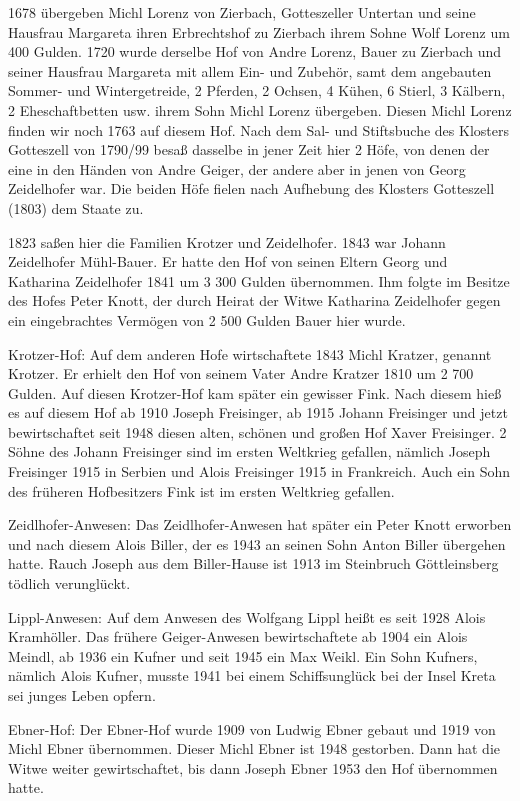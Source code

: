 \documentclass{book}
\begin{document}
1678 übergeben Michl Lorenz von Zierbach, Gotteszeller Untertan und seine
Hausfrau Margareta ihren Erbrechtshof zu Zierbach ihrem Sohne Wolf Lorenz um 400
Gulden. 1720 wurde derselbe Hof von Andre Lorenz, Bauer zu Zierbach und seiner
Hausfrau Margareta mit allem Ein- und Zubehör, samt dem angebauten Sommer- und
Wintergetreide, 2 Pferden, 2 Ochsen, 4 Kühen, 6 Stierl, 3 Kälbern, 2
Eheschaftbetten usw. ihrem Sohn Michl Lorenz übergeben. Diesen Michl Lorenz
finden wir noch 1763 auf diesem Hof. Nach dem Sal- und Stiftsbuche des Klosters
Gotteszell von 1790/99 besaß dasselbe in jener Zeit hier 2 Höfe, von denen der
eine in den Händen von Andre Geiger, der andere aber in jenen von Georg
Zeidelhofer war. Die beiden Höfe fielen nach Aufhebung des Klosters Gotteszell
(1803) dem Staate zu.

1823 saßen hier die Familien Krotzer und Zeidelhofer. 1843 war Johann
Zeidelhofer Mühl-Bauer. Er hatte den Hof von seinen Eltern Georg und Katharina
Zeidelhofer 1841 um 3 300 Gulden übernommen. Ihm folgte im Besitze des Hofes
Peter Knott, der durch Heirat der Witwe Katharina Zeidelhofer gegen ein
eingebrachtes Vermögen von 2 500 Gulden Bauer hier wurde.

Krotzer-Hof: Auf dem anderen Hofe wirtschaftete 1843 Michl Kratzer, genannt
Krotzer. Er erhielt den Hof von seinem Vater Andre Kratzer 1810 um 2 700 Gulden.
Auf diesen Krotzer-Hof kam später ein gewisser Fink. Nach diesem hieß es auf
diesem Hof ab 1910 Joseph Freisinger, ab 1915 Johann Freisinger und jetzt
bewirtschaftet seit 1948 diesen alten, schönen und großen Hof Xaver Freisinger.
2 Söhne des Johann Freisinger sind im ersten Weltkrieg gefallen, nämlich Joseph
Freisinger 1915 in Serbien und Alois Freisinger 1915 in Frankreich. Auch ein
Sohn des früheren Hofbesitzers Fink ist im ersten Weltkrieg gefallen.

Zeidlhofer-Anwesen: Das Zeidlhofer-Anwesen hat später ein Peter Knott erworben
und nach diesem Alois Biller, der es 1943 an seinen Sohn Anton Biller übergehen
hatte. Rauch Joseph aus dem Biller-Hause ist 1913 im Steinbruch Göttleinsberg
tödlich verunglückt.

Lippl-Anwesen: Auf dem Anwesen des Wolfgang Lippl heißt es seit 1928 Alois
Kramhöller. Das frühere Geiger-Anwesen bewirtschaftete ab 1904 ein Alois Meindl,
ab 1936 ein Kufner und seit 1945 ein Max Weikl. Ein Sohn Kufners, nämlich Alois
Kufner, musste 1941 bei einem Schiffsunglück bei der Insel Kreta sei junges
Leben opfern.

Ebner-Hof: Der Ebner-Hof wurde 1909 von Ludwig Ebner gebaut und 1919 von Michl
Ebner übernommen. Dieser Michl Ebner ist 1948 gestorben. Dann hat die Witwe
weiter gewirtschaftet, bis dann Joseph Ebner 1953 den Hof übernommen hatte.
\end{document}
